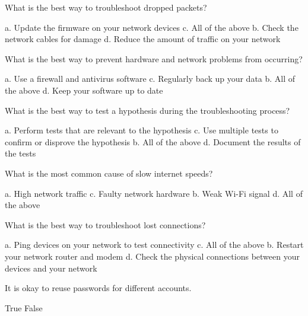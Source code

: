 \documentclass{exam}
\begin{document}
\begin{questions}
\question What is the best way to troubleshoot dropped packets?
\begin{checkboxes}
\choice a. Update the firmware on your network devices
\CorrectChoice c. All of the above
\choice b. Check the network cables for damage
\choice d. Reduce the amount of traffic on your network
\end{checkboxes}

\question What is the best way to prevent hardware and network problems from occurring?
\begin{checkboxes}
\choice a. Use a firewall and antivirus software
\choice c. Regularly back up your data
\CorrectChoice b. All of the above
\choice d. Keep your software up to date
\end{checkboxes}

\question What is the best way to test a hypothesis during the troubleshooting process?
\begin{checkboxes}
\choice a. Perform tests that are relevant to the hypothesis
\choice c. Use multiple tests to confirm or disprove the hypothesis
\CorrectChoice b. All of the above
\choice d. Document the results of the tests
\end{checkboxes}

\question What is the most common cause of slow internet speeds?
\begin{checkboxes}
\choice a. High network traffic
\choice c. Faulty network hardware
\choice b. Weak Wi-Fi signal
\CorrectChoice d. All of the above
\end{checkboxes}

\question What is the best way to troubleshoot lost connections?
\begin{checkboxes}
\choice a. Ping devices on your network to test connectivity
\CorrectChoice c. All of the above
\choice b. Restart your network router and modem
\choice d. Check the physical connections between your devices and your network
\end{checkboxes}

\question It is okay to reuse passwords for different accounts.
\begin{checkboxes}
\choice True
\CorrectChoice False
\end{checkboxes}

\end{questions}
\end{document}
